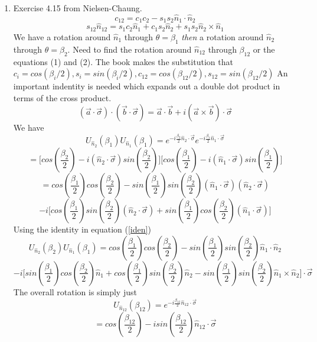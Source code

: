 \documentclass[12pt]{article}
\begin{document}
\begin{enumerate}
    \item Exercise 4.15 from Nielsen-Chaung. 
    \begin{equation}
        c_{12} = c_1 c_2 - s_1 s_2 \hat{n}_1 \cdot \hat{n}_2 
    \end{equation}
    \begin{equation}
        s_{12}\hat{n}_{12} = s_1 c_2 \hat{n}_1 + c_1 s_2 \hat{n}_2 + s_1 s_2 \hat{n}_2 \times \hat{n}_1 
    \end{equation}
    We have a rotation around $\hat{n}_1$ through $\theta = \beta_1$ \emph{then} a rotation around $\hat{n}_2$ through $\theta = \beta_2$. Need to find the rotation around $\hat{n}_{12}$ through $\beta_{12}$ or the equations (1) and (2). The book makes the substitution that $c_i = cos(\beta_i /2), s_i = sin(\beta_i /2), c_{12} = cos(\beta_{12}/2), s_{12} = sin(\beta_{12} /2)$ 
    An important indentity is needed which expands out a double dot product in terms of the cross product. 
    \begin{equation} \label{iden}
         (\vec{a} \cdot \vec{\sigma}) \cdot (\vec{b} \cdot \vec{\sigma}) = \vec{a} \cdot \vec{b} + i(\vec{a} \times \vec{b}) \cdot \vec{\sigma} 
    \end{equation}
    We have 
    $$ U_{\hat{n}_2} (\beta_1) U_{\hat{n}_1}(\beta_1) = e^{-i \frac{\beta_2}{2} \hat{n}_2 \cdot \vec{\sigma}} e^{-i \frac{\beta_1}{2} \hat{n}_1 \cdot \vec{\sigma}} $$
    $$ = \Big[ cos(\frac{\beta_2}{2}) - i(\hat{n}_2 \cdot \vec{\sigma}) sin(\frac{\beta_2}{2})\Big]\Big[cos(\frac{\beta_1}{2}) -i(\hat{n}_1 \cdot \vec{\sigma})sin(\frac{\beta_1}{2})\Big] $$
    $$ = cos(\frac{\beta_1}{2}) cos(\frac{\beta_2}{2}) - sin(\frac{\beta_1}{2})sin(\frac{\beta_2}{2}) (\hat{n}_1 \cdot \vec{\sigma})(\hat{n}_2 \cdot \vec{\sigma}) $$
    $$ -i \Big[ cos(\frac{\beta_1}{2}) sin(\frac{\beta_2}{2})(\hat{n}_2 \cdot \vec{\sigma}) + sin(\frac{\beta_1}{2}) cos(\frac{\beta_2}{2}) (\hat{n}_1 \cdot \vec{\sigma})\Big] $$
    Using the identity in equation (\ref{iden}) 
    $$ U_{\hat{n}_2} (\beta_2) U_{\hat{n}_1}(\beta_1) = cos(\frac{\beta_1}{2}) cos(\frac{\beta_2}{2}) -sin(\frac{\beta_1}{2})sin(\frac{\beta_2}{2}) \hat{n}_1 \cdot \hat{n}_2 $$
    $$ -i \Big[ sin(\frac{\beta_1}{2})cos(\frac{\beta_2}{2}) \hat{n}_1 + cos(\frac{\beta_1}{2})sin(\frac{\beta_2}{2}) \hat{n}_2 - sin(\frac{\beta_1}{2})sin(\frac{\beta_2}{2}) \hat{n}_1 \times \hat{n}_2 \Big] \cdot \vec{\sigma} $$
    The overall rotation is simply just 
    $$ U_{\hat{n}_{12}}(\beta_{12}) = e^{-i \frac{\beta_{12}}{2} \hat{n}_{12} \cdot \vec{\sigma}} $$
    $$ = cos (\frac{\beta_{12}}{2}) - isin(\frac{\beta_{12}}{2}) \hat{n}_{12} \cdot \vec{\sigma} $$

\end{enumerate}
\end{document}

